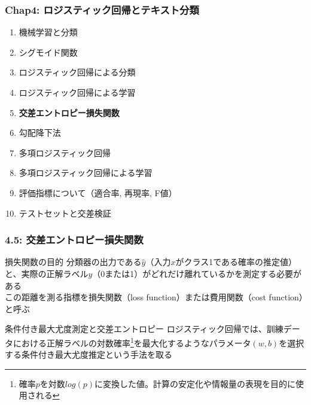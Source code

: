 \documentclass[unicode,11pt]{beamer} %
\begin{document}
\begin{frame}
    \frametitle{Chap4: ロジスティック回帰とテキスト分類}
    \begin{block}{}
        \begin{enumerate}
            \item 機械学習と分類
            \item シグモイド関数
            \item ロジスティック回帰による分類
            \item ロジスティック回帰による学習
            \item {\color{red}\textbf{交差エントロピー損失関数}}
            \item 勾配降下法
            \item 多項ロジスティック回帰
            \item 多項ロジスティック回帰による学習
            \item 評価指標について（適合率, 再現率, F値）
            \item テストセットと交差検証
        \end{enumerate}
    \end{block}
\end{frame}

\begin{frame}
    \frametitle{4.5: 交差エントロピー損失関数}
    \begin{alertblock}{損失関数の目的}
        分類器の出力である$\hat{y}$（入力$x$がクラス1である確率の推定値）と、実際の正解ラベル$y$（0または1）がどれだけ離れているかを測定する必要がある
        \\この距離を測る指標を損失関数（loss function）または費用関数（cost function）と呼ぶ
    \end{alertblock}
    \begin{alertblock}{条件付き最大尤度測定と交差エントロピー}
        ロジスティック回帰では、訓練データにおける正解ラベルの対数確率\footnote{確率$p$を対数$log(p)$に変換した値。計算の安定化や情報量の表現を目的に使用される}を最大化するようなパラメータ$(w, b)$を選択する条件付き最大尤度推定という手法を取る
    \end{alertblock}
\end{frame}
\end{document}
